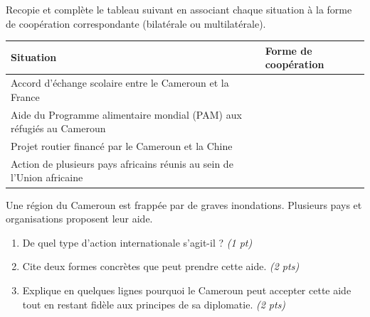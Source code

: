\documentclass[11pt]{article}
\begin{document}
\begin{exercice}
Recopie et complète le tableau suivant en associant chaque situation à la forme de coopération correspondante (bilatérale ou multilatérale).
\begin{center}
\begin{tabular}{|p{8cm}|p{4cm}|}
\hline
\textbf{Situation} & \textbf{Forme de coopération} \\
\hline
Accord d'échange scolaire entre le Cameroun et la France & \\
\hline
Aide du Programme alimentaire mondial (PAM) aux réfugiés au Cameroun & \\
\hline
Projet routier financé par le Cameroun et la Chine & \\
\hline
Action de plusieurs pays africains réunis au sein de l'Union africaine & \\
\hline
\end{tabular}
\end{center}
\end{exercice}

\begin{exercice}
Une région du Cameroun est frappée par de graves inondations. Plusieurs pays et organisations proposent leur aide.
\begin{enumerate}
  \item De quel type d'action internationale s'agit-il ? \emph{(1 pt)}
  \item Cite deux formes concrètes que peut prendre cette aide. \emph{(2 pts)}
  \item Explique en quelques lignes pourquoi le Cameroun peut accepter cette aide tout en restant fidèle aux principes de sa diplomatie. \emph{(2 pts)}
\end{enumerate}
\end{exercice}
\end{document}
